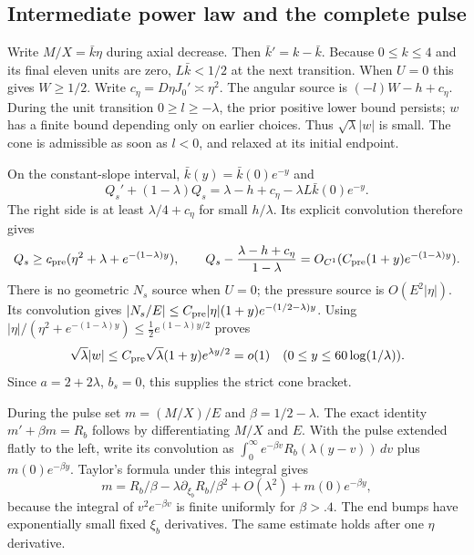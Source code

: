 \documentclass[10pt,a4paper]{article}
\begin{document}
\subsection{Intermediate power law and the complete pulse}
Write $M/X=\bar k\eta$ during axial decrease. Then $\bar k'=k-\bar k$.
Because $0\le k\le4$ and its final eleven units are zero,
$L\bar k<1/2$ at the next transition. When $U=0$ this gives $W\ge1/2$.
Write $c_\eta=D\eta J_0'\asymp\eta^2$. The angular source is
$(-l)W-h+c_\eta$. During the unit transition $0\ge l\ge-\lambda$,
the prior positive lower bound persists; $w$ has a finite bound depending
only on earlier choices. Thus $\sqrt\lambda|w|$ is small. The cone is
admissible as soon as $l<0$, and relaxed at its initial endpoint.

On the constant-slope interval, $\bar k(y)=\bar k(0)e^{-y}$ and
\[
Q_s'+(1-\lambda)Q_s=\lambda-h+c_\eta-\lambda L\bar k(0)e^{-y}.
\]
The right side is at least $\lambda/4+c_\eta$ for small $h/\lambda$.
Its explicit convolution therefore gives
\[
Q_s\ge c_{\rm pre}(\eta^2+\lambda+e^{-(1-\lambda)y}),\qquad
Q_s-\frac{\lambda-h+c_\eta}{1-\lambda}
=O_{C^1}(C_{\rm pre}(1+y)e^{-(1-\lambda)y}).
\]
There is no geometric $N_s$ source when $U=0$; the pressure source is
$O(E^2|\eta|)$. Its convolution gives
$|N_s/E|\le C_{\rm pre}|\eta|(1+y)e^{-(1/2-\lambda)y}$.
Using $|\eta|/(\eta^2+e^{-(1-\lambda)y})
\le\tfrac12e^{(1-\lambda)y/2}$ proves
\[
\sqrt\lambda|w|\le C_{\rm pre}\sqrt\lambda(1+y)e^{\lambda y/2}=o(1)
\quad(0\le y\le60\log(1/\lambda)).
\]
Since $a=2+2\lambda$, $b_s=0$, this supplies the strict cone bracket.

During the pulse set $m=(M/X)/E$ and $\beta=1/2-\lambda$.
The exact identity $m'+\beta m=R_b$ follows by differentiating $M/X$ and $E$.
With the pulse extended flatly to the left, write its convolution as
$\int_0^\infty e^{-\beta v}R_b(\lambda(y-v))\,dv$ plus
$m(0)e^{-\beta y}$. Taylor's formula under this integral gives
\[
m=R_b/\beta-\lambda\partial_{\xi_b}R_b/\beta^2
+O(\lambda^2)+m(0)e^{-\beta y},
\]
because the integral of $v^2e^{-\beta v}$ is finite uniformly for
$\beta>.4$. The end bumps have exponentially small fixed $\xi_b$ derivatives.
The same estimate holds after one $\eta$ derivative.
\end{document}
